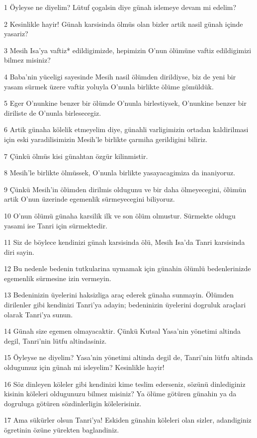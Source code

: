 \par 1 Öyleyse ne diyelim? Lütuf çogalsin diye günah islemeye devam mi edelim?
\par 2 Kesinlikle hayir! Günah karsisinda ölmüs olan bizler artik nasil günah içinde yasariz?
\par 3 Mesih Isa'ya vaftiz* edildigimizde, hepimizin O'nun ölümüne vaftiz edildigimizi bilmez misiniz?
\par 4 Baba'nin yüceligi sayesinde Mesih nasil ölümden dirildiyse, biz de yeni bir yasam sürmek üzere vaftiz yoluyla O'nunla birlikte ölüme gömüldük.
\par 5 Eger O'nunkine benzer bir ölümde O'nunla birlestiysek, O'nunkine benzer bir diriliste de O'nunla birlesecegiz.
\par 6 Artik günaha kölelik etmeyelim diye, günahli varligimizin ortadan kaldirilmasi için eski yaradilisimizin Mesih'le birlikte çarmiha gerildigini biliriz.
\par 7 Çünkü ölmüs kisi günahtan özgür kilinmistir.
\par 8 Mesih'le birlikte ölmüssek, O'nunla birlikte yasayacagimiza da inaniyoruz.
\par 9 Çünkü Mesih'in ölümden dirilmis oldugunu ve bir daha ölmeyecegini, ölümün artik O'nun üzerinde egemenlik sürmeyecegini biliyoruz.
\par 10 O'nun ölümü günaha karsilik ilk ve son ölüm olmustur. Sürmekte oldugu yasami ise Tanri için sürmektedir.
\par 11 Siz de böylece kendinizi günah karsisinda ölü, Mesih Isa'da Tanri karsisinda diri sayin.
\par 12 Bu nedenle bedenin tutkularina uymamak için günahin ölümlü bedenlerinizde egemenlik sürmesine izin vermeyin.
\par 13 Bedeninizin üyelerini haksizliga araç ederek günaha sunmayin. Ölümden dirilenler gibi kendinizi Tanri'ya adayin; bedeninizin üyelerini dogruluk araçlari olarak Tanri'ya sunun.
\par 14 Günah size egemen olmayacaktir. Çünkü Kutsal Yasa'nin yönetimi altinda degil, Tanri'nin lütfu altindasiniz.
\par 15 Öyleyse ne diyelim? Yasa'nin yönetimi altinda degil de, Tanri'nin lütfu altinda oldugumuz için günah mi isleyelim? Kesinlikle hayir!
\par 16 Söz dinleyen köleler gibi kendinizi kime teslim ederseniz, sözünü dinlediginiz kisinin köleleri oldugunuzu bilmez misiniz? Ya ölüme götüren günahin ya da dogruluga götüren sözdinlerligin kölelerisiniz.
\par 17 Ama sükürler olsun Tanri'ya! Eskiden günahin köleleri olan sizler, adandiginiz ögretinin özüne yürekten baglandiniz.
